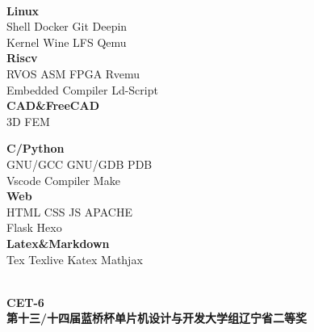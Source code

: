 \documentclass{ctexart}
\begin{document}
\begin{center}
    \hrulefill \\
    \begin{minipage}[t]{18em}
        \centering
        \textbf{Linux} \\
        Shell \quad Docker \quad Git \quad Deepin \\
        Kernel \quad Wine \quad LFS \quad Qemu \\
        
        \textbf{Riscv} \\
        RVOS \quad ASM \quad FPGA \quad Rvemu \\
        Embedded \quad Compiler \quad Ld-Script \\
        \textbf{CAD\&FreeCAD} \\
        3D \quad FEM \\
    \end{minipage}
    \quad 
    \begin{minipage}[t]{18em}
        \centering
        \textbf{C/Python} \\
        GNU/GCC \quad GNU/GDB \quad PDB \\
        Vscode \quad Compiler \quad Make \\
        \textbf{Web} \\
        HTML \quad CSS \quad JS \quad APACHE \\
        Flask \quad Hexo \\
        \textbf{Latex\&Markdown}\\
        Tex \quad Texlive \quad Katex \quad Mathjax \\
    \end{minipage}
    \quad
\end{center}

\begin{flushleft}
    \hrulefill \\
    \textbullet \textbf{CET-6 } \\
    \textbullet \textbf{第十三/十四届蓝桥杯单片机设计与开发大学组辽宁省二等奖} \\
\end{flushleft}
\end{document}
